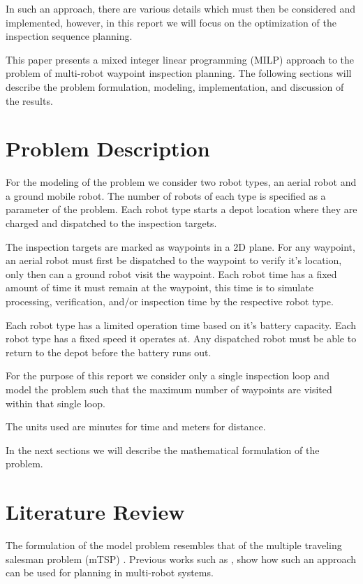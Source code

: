 \documentclass{article}
\begin{document}
		In such an approach, there are various details which must then be considered and implemented, however, in this report we will focus on the optimization of the inspection sequence planning. 

		This paper presents a mixed integer linear programming (MILP) approach to the problem of multi-robot waypoint inspection planning.
		The following sections will describe the problem formulation, modeling, implementation, and discussion of the results.


	\section{Problem Description}\label{prob_desc}

		For the modeling of the problem we consider two robot types, an aerial robot and a ground mobile robot. 
		The number of robots of each type is specified as a parameter of the problem.
		Each robot type starts a depot location where they are charged and dispatched to the inspection targets.

		The inspection targets are marked as waypoints in a 2D plane.
		For any waypoint, an aerial robot must first be dispatched to the waypoint to verify it's location, only then can a ground robot visit the waypoint.
		Each robot time has a fixed amount of time it must remain at the waypoint, this time is to simulate processing, verification, and/or inspection time by the respective robot type.

		Each robot type has a limited operation time based on it's battery capacity.
		Each robot type has a fixed speed it operates at.
		Any dispatched robot must be able to return to the depot before the battery runs out.

		For the purpose of this report we consider only a single inspection loop and model the problem such that the maximum number of waypoints are visited within that single loop.

		The units used are minutes for time and meters for distance.

		In the next sections we will describe the mathematical formulation of the problem.

	

	\section{Literature Review}\label{lit_review}

		The formulation of the model problem resembles that of the multiple traveling salesman problem (mTSP) .
		Previous works such as \cite{oberlin2009transformation} \cite{albert2017uav}, show how such an approach can be used for planning in multi-robot systems.
\end{document}

